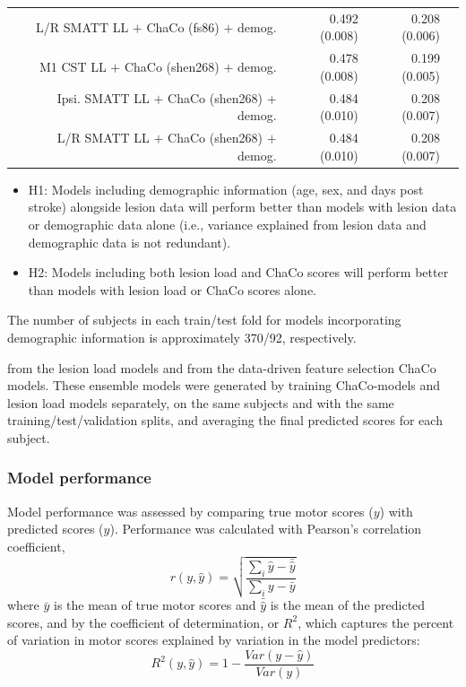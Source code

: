 \documentclass[10pt]{article}
\def\Plus{\texttt{+}}
\begin{document}
\begin{table}[h]
\begin{tabular}{rrrrr}
 & L/R SMATT LL $\Plus$ ChaCo  (fs86) $\Plus$ demog. & 0.492 (0.008) & 0.208 (0.006) \\
 & M1 CST LL $\Plus$ ChaCo  (shen268) $\Plus$ demog. & 0.478 (0.008) & 0.199 (0.005) \\
 & Ipsi. SMATT LL $\Plus$ ChaCo  (shen268) $\Plus$ demog. & 0.484 (0.010) & 0.208 (0.007) \\
 & L/R SMATT LL $\Plus$ ChaCo  (shen268) $\Plus$ demog. & 0.484 (0.010) & 0.208 (0.007) \\
\bottomrule
\end{tabular}
\end{table}

\begin{itemize}
\item H1: Models including demographic information (age, sex, and days post stroke) alongside lesion data will perform better than models with lesion data or demographic data alone (i.e., variance explained from lesion data and demographic data is not redundant).
\item H2: Models including both lesion load and ChaCo scores will perform better than models with lesion load or ChaCo scores alone.
\end{itemize}

 The number of subjects in each train/test fold for models incorporating demographic information is approximately 370/92, respectively.

from the lesion load models and from the data-driven feature selection ChaCo models. These ensemble models were generated by training ChaCo-models and lesion load models separately, on the same subjects and with the same training/test/validation splits, and averaging the final predicted scores for each subject. 



\subsubsection*{Model performance}
Model performance was assessed by comparing true motor scores ($y$) with predicted scores ($\hat{y}$). Performance was calculated with Pearson's correlation coefficient, 
\begin{equation}
    r(y, \hat{y}) = \sqrt{\frac{\sum_i{\hat{y}-\bar{\hat{y}}}}{\sum_i{y-\bar{y}}}}
\end{equation}
where $\bar{y}$ is the mean of true motor scores and  $\bar{\hat{y}}$ is the mean of the predicted scores, and by the coefficient of determination, or $R^2$, which captures the percent of variation in motor scores explained by variation in the model predictors:
\begin{equation}
    R^2(y, \hat{y}) = 1 - \frac{Var(y-\hat{y})}{Var(y)}
\end{equation}
\end{document}

